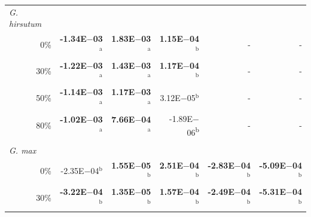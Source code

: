 \begin{landscape}
\begin{table}
{\begin{tabular}{p{2cm}p{3.2cm}p{3.2cm}p{3.2cm}p{3.2cm}p{3.2cm}}
            \multicolumn{1}{l}{\textit{G. hirsutum}} \\
            \multicolumn{1}{r}{0\%}
            &  \multicolumn{1}{r}{\textbf{-1.34E$-$03$^\mathrm{a}$}}
            &  \multicolumn{1}{r}{\textbf{ 1.83E$-$03$^\mathrm{a}$}}
            &  \multicolumn{1}{r}{\textbf{ 1.15E$-$04$^\mathrm{b}$}}
            &  \multicolumn{1}{r}{-}
            &  \multicolumn{1}{r}{-}
            \\
            \multicolumn{1}{r}{30\%}                     
            &  \multicolumn{1}{r}{\textbf{-1.22E$-$03$^\mathrm{a}$}}
            &  \multicolumn{1}{r}{\textbf{ 1.43E$-$03$^\mathrm{a}$}}
            &  \multicolumn{1}{r}{\textbf{ 1.17E$-$04$^\mathrm{b}$}}
            &  \multicolumn{1}{r}{-}
            &  \multicolumn{1}{r}{-}
            \\
            \multicolumn{1}{r}{50\%}
            &  \multicolumn{1}{r}{\textbf{-1.14E$-$03$^\mathrm{a}$}}
            &  \multicolumn{1}{r}{\textbf{ 1.17E$-$03$^\mathrm{a}$}}
            &  \multicolumn{1}{r}{3.12E$-$05$^\mathrm{b}$}
            &  \multicolumn{1}{r}{-}
            &  \multicolumn{1}{r}{-}
            \\
            \multicolumn{1}{r}{80\%}
            &  \multicolumn{1}{r}{\textbf{-1.02E$-$03$^\mathrm{a}$}}
            &  \multicolumn{1}{r}{\textbf{ 7.66E$-$04$^\mathrm{a}$}}
            &  \multicolumn{1}{r}{-1.89E$-$06\textsuperscript{b}}
            &  \multicolumn{1}{r}{-}
            &  \multicolumn{1}{r}{-}
            \\
            &&&& 
            \\
            \multicolumn{1}{l}{\textit{G. max}}
            \\
            \multicolumn{1}{r}{0\%}
            &  \multicolumn{1}{r}{ -2.35E$-$04$^\mathrm{b}$}
            &  \multicolumn{1}{r}{\textbf{ 1.55E$-$05$^\mathrm{b}$}}
            &  \multicolumn{1}{r}{\textbf{ 2.51E$-$04$^\mathrm{b}$}}
            &  \multicolumn{1}{r}{\textbf{-2.83E$-$04$^\mathrm{b}$}}
            &  \multicolumn{1}{r}{\textbf{-5.09E$-$04$^\mathrm{b}$}}
            \\
              
            \multicolumn{1}{r}{30\%}
            &  \multicolumn{1}{r}{\textbf{-3.22E$-$04$^\mathrm{b}$}}
            &  \multicolumn{1}{r}{\textbf{ 1.35E$-$05$^\mathrm{b}$}}
            &  \multicolumn{1}{r}{\textbf{ 1.57E$-$04$^\mathrm{b}$}}
            &  \multicolumn{1}{r}{\textbf{-2.49E$-$04$^\mathrm{b}$}}
            &  \multicolumn{1}{r}{\textbf{-5.31E$-$04$^\mathrm{b}$}}
            \\
              

\end{tabular}}
\end{table}
\end{landscape}
